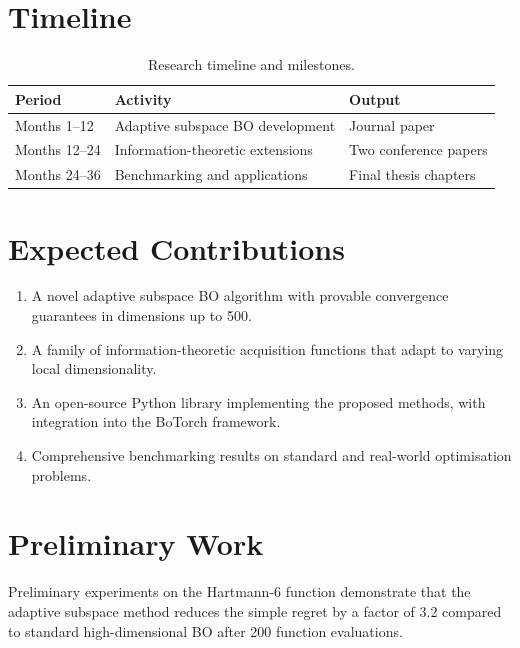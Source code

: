 \documentclass[
    language=english,
    doctype=thesis-proposal,
    institution=none,
]{../../omnilatex}
\begin{document}
\section{Timeline}
\begin{table}[htbp]
    \centering
    \caption{Research timeline and milestones.}
    \label{tab:timeline}
    \begin{tabular}{@{}lll@{}}
        \toprule
        \textbf{Period} & \textbf{Activity} & \textbf{Output} \\
        \midrule
        Months 1--12  & Adaptive subspace BO development & Journal paper \\
        Months 12--24 & Information-theoretic extensions  & Two conference papers \\
        Months 24--36 & Benchmarking and applications    & Final thesis chapters \\
        \bottomrule
    \end{tabular}
\end{table}

\section{Expected Contributions}
\begin{enumerate}
    \item A novel adaptive subspace BO algorithm with provable convergence
    guarantees in dimensions up to 500.
    \item A family of information-theoretic acquisition functions that adapt to
    varying local dimensionality.
    \item An open-source Python library implementing the proposed methods, with
    integration into the BoTorch framework.
    \item Comprehensive benchmarking results on standard and real-world
    optimisation problems.
\end{enumerate}

\section{Preliminary Work}
Preliminary experiments on the Hartmann-6 function demonstrate that the adaptive
subspace method reduces the simple regret by a factor of 3.2 compared to
standard high-dimensional BO after 200 function evaluations.

\printbibliography
\end{document}

